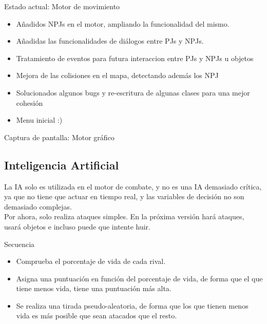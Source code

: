 \documentclass[9pt,xcolor=svgnames]{beamer}
\begin{document}
   \begin{frame}{Estado actual: Motor de movimiento}
    \begin{itemize}
     \item Añadidos NPJs en el motor, ampliando la funcionalidad del mismo.
     \item Añadidas las funcionalidades de diálogos entre PJs y NPJs.
     \item Tratamiento de eventos para futura interaccion entre PJs y
	   NPJs u objetos
     \item Mejora de las colisiones en el mapa, detectando además los NPJ
     \item Solucionados algunos bugs y re-escritura de algunas clases
	   para una mejor cohesión
     \item Menu inicial :)
    \end{itemize}
   \end{frame}


   \begin{frame}{Captura de pantalla: Motor gráfico}
    
   \end{frame}

   \subsection{Inteligencia Artificial}
   \begin{frame}
     La IA solo es utilizada en el motor de combate, y no es una IA
     demasiado crítica, ya que no tiene que actuar en tiempo real, y
     las variables de decisión no son demasiado complejas.\\

     Por ahora, solo realiza ataques simples. En la próxima versión hará
     ataques, usará objetos e incluso puede que intente huir.\\

     \begin{block}{Secuencia}
       \begin{itemize}
       \item Comprueba el porcentaje de vida de cada rival.
       \item Asigna una puntuación en función del porcentaje de vida,
         de forma que el que tiene menos vida, tiene una puntuación más alta.
       \item Se realiza una tirada pseudo-aleatoria, de forma que los
         que tienen menos vida es más posible que sean atacados que el resto.
       \end{itemize}
     \end{block}
   \end{frame}
   
\end{document}
